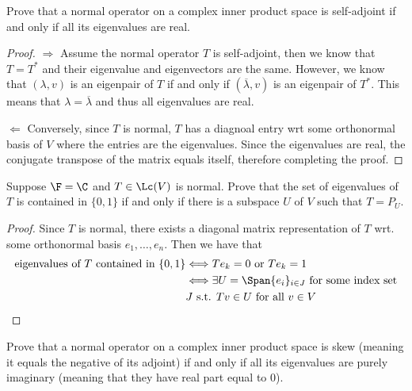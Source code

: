 \documentclass{extarticle}
\begin{document}

\newpage
{}


\begin{problem}{1}
    Prove that a normal operator on a complex inner product space is self-adjoint if and only if
    all its eigenvalues are real.
\end{problem}

\begin{proof}
\(\Rightarrow\) Assume the normal operator \(T\) is self-adjoint, then we know that \(T = T^*\) and
their eigenvalue and eigenvectors are the same. However, we know that \((\lambda, v)\) is an eigenpair
of \(T\) if and only if \((\overline{\lambda}, v)\) is an eigenpair of \(T^*\). This means that
\(\lambda = \overline{\lambda}\) and thus all eigenvalues are real.

\(\Leftarrow\) Conversely, since \(T\) is normal, \(T\) has a diagnoal entry wrt some orthonormal
basis of \(V\) where the entries are the eigenvalues. Since the eigenvalues are real, the conjugate transpose of
the matrix equals itself, therefore completing the proof.
\end{proof}

\begin{problem}{3}
    Suppose \(\F = \C\) and \(T \in \Lc(V)\) is normal. Prove that the set of eigenvalues
    of \(T\) is contained in \(\{0, 1\}\) if and only if there is a subspace \(U\) of \(V\) such
    that \(T = P_U\).
\end{problem}

\begin{proof}
Since \(T\) is normal, there exists a diagonal matrix representation of \(T\) wrt. some orthonormal
basis \(e_1, \ldots, e_n\). Then we have that
\begin{align*}
    \text{eigenvalues of } T \text{ contained in } \{0, 1\}
    &\Longleftrightarrow Te_k = 0 \text{ or } T e_k = 1 \\
    &\Longleftrightarrow \exists U = \Span\{e_i\}_{i \in J} \text{ for some index set}\\
    &J \text{ s.t. } Tv \in U \text{ for all } v \in V
\end{align*}
\end{proof}

\begin{problem}{4}
    Prove that a normal operator on a complex inner product space is skew (meaning it equals the negative
    of its adjoint) if and only if all its eigenvalues are purely imaginary (meaning that they have
    real part equal to 0).
\end{problem}
\end{document}
